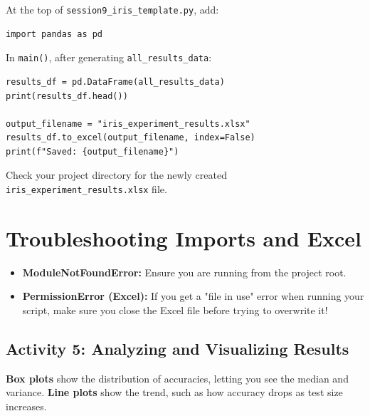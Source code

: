 \begin{tcolorbox}[title=Do: Use Pandas to Process and Save Results]
At the top of \texttt{session9\_iris\_template.py}, add:
\begin{verbatim}
import pandas as pd
\end{verbatim}

In \texttt{main()}, after generating \texttt{all\_results\_data}:
\begin{verbatim}
results_df = pd.DataFrame(all_results_data)
print(results_df.head())

output_filename = "iris_experiment_results.xlsx"
results_df.to_excel(output_filename, index=False)
print(f"Saved: {output_filename}")
\end{verbatim}
\end{tcolorbox}

\begin{tcolorbox}[title=Checkpoint]
Check your project directory for the newly created \texttt{iris\_experiment\_results.xlsx} file.
\end{tcolorbox}

\section{Troubleshooting Imports and Excel}
\begin{tcolorbox}[title=Common Mistakes \& Troubleshooting]
\begin{itemize}
    \item \textbf{ModuleNotFoundError:} Ensure you are running from the project root.
    \item \textbf{PermissionError (Excel):} If you get a "file in use" error when running your script, make sure you close the Excel file before trying to overwrite it!
\end{itemize}
\end{tcolorbox}

\newpage
\subsection{Activity 5: Analyzing and Visualizing Results}

\textbf{Box plots} show the distribution of accuracies, letting you see the median and variance. \textbf{Line plots} show the trend, such as how accuracy drops as test size increases.

